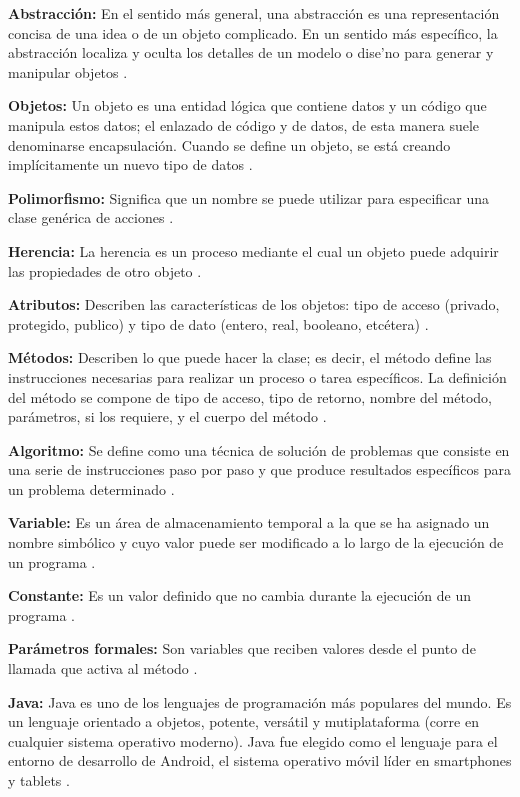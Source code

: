 \textbf{Abstracción:} En el sentido más general, una abstracción es una representación concisa de una idea o de un objeto complicado. En un sentido más específico, la abstracción localiza y oculta los detalles de un modelo o dise'no para generar y manipular objetos \citep{izquierdo2007introduccion}. 

\textbf{Objetos:} Un objeto es una entidad lógica que contiene datos y un código que manipula estos datos; el enlazado de código y de datos, de esta manera suele denominarse encapsulación. Cuando se define un objeto, se está creando implícitamente un nuevo tipo de datos \citep{izquierdo2007introduccion}.

\textbf{Polimorfismo:} Significa que un nombre se puede utilizar para especificar una clase genérica de acciones \citep{izquierdo2007introduccion}. 

\textbf{Herencia:} La herencia es un proceso mediante el cual un objeto puede adquirir las propiedades de otro objeto \citep{izquierdo2007introduccion}. 

\textbf{Atributos:} Describen las características de los objetos: tipo de acceso (privado, protegido, publico) y tipo de dato (entero, real, booleano, etcétera) \citep{izquierdo2007introduccion}. 

\textbf{Métodos:} Describen lo que puede hacer la clase; es decir, el método define las instrucciones necesarias para realizar un proceso o tarea específicos. La definición del método se compone de tipo de acceso, tipo de retorno, nombre del método, parámetros, si los requiere, y el cuerpo del método \citep{izquierdo2007introduccion}.

\textbf{Algoritmo:} Se define como una técnica de solución de problemas que consiste en una serie de instrucciones paso por paso y que produce resultados específicos para un problema determinado \citep{izquierdo2007introduccion}. 

\textbf{Variable:} Es un área de almacenamiento temporal a la que se ha asignado un nombre simbólico y cuyo valor puede ser modificado a lo largo de la ejecución de un programa \citep{izquierdo2007introduccion}. 

\textbf{Constante:} Es un valor definido que no cambia durante la ejecución de un programa \citep{izquierdo2007introduccion}. 

\textbf{Parámetros formales:} Son variables que reciben valores desde el punto de llamada que activa al método \citep{izquierdo2007introduccion}.

\textbf{Java:} Java es uno de los lenguajes de programación más populares del mundo. Es un lenguaje orientado a objetos, potente, versátil y mutiplataforma (corre en cualquier sistema operativo moderno). Java fue elegido como el lenguaje para el entorno de desarrollo de Android, el sistema operativo móvil líder en smartphones y tablets \citep{izquierdo2007introduccion}.

